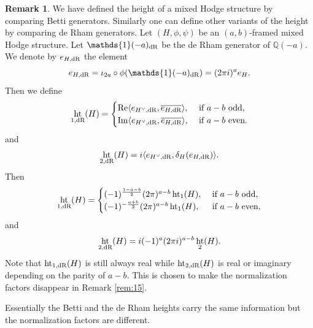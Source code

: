 \documentclass[11pt,a4paper]{amsart}
\newcommand{\dR}{\text{\rm dR}}
\newcommand{\Q}{\mathds{Q}}
\newcommand{\bfone}{{\mathds{1}}}
\DeclareMathOperator{\im}{Im}
\DeclareMathOperator{\re}{Re}
\DeclareMathOperator{\Ht}{ht}
\numberwithin{equation}{section}
\theoremstyle{plain}
\theoremstyle{definition}
\newtheorem{rmk}[prop]{Remark}
\begin{document}
\begin{rmk}\label{rem:14}
  We have defined the height of a mixed Hodge structure by comparing
  Betti generators. Similarly one can define other variants of the height
  by comparing de Rham generators. Let  $(H, \phi,\psi)$ be an $(a,b)$-framed
  mixed Hodge structure. Let $\bfone(-a)_{\dR}$ be the de Rham generator of
  $\Q(-a)$.
  We denote by $e_{H,\dR}$ the element
  \begin{displaymath}
    e_{H,\dR}=\iota_{2a}\circ \phi (\bfone(-a)_{\dR})=
    (2\pi i)^{a}e_{H}.
  \end{displaymath}
  Then we define
  \begin{displaymath}
    \Ht_{1,\dR}(H)=
    \begin{cases}
      \re\langle e_{H^{\vee},\dR},\overline{e_{H,\dR}}\rangle,&\text{ if $a-b$
                                                     odd},\\
      \im\langle e_{H^{\vee},\dR},\overline{e_{H,\dR}}\rangle,&\text{ if
                                                     $a-b$ even}.
    \end{cases}
  \end{displaymath}
  and
  \begin{displaymath}
    \Ht_{2,\dR}(H)=i\langle e_{H^{\vee},\dR},\delta_{H}(e_{H,\dR})\rangle.
  \end{displaymath}
  Then
  \begin{displaymath}
    \Ht_{1,\dR}(H)=
    \begin{cases}
      (-1)^{\frac{1-a-b}{2}}(2\pi )^{a-b}\Ht_{1}(H),&\text{ if $a-b$
                                                      odd},\\
      (-1)^{-\frac{a+b}{2}}(2\pi )^{a-b}\Ht_{1}(H),&\text{ if $a-b$
                                                     even},\\
    \end{cases}
  \end{displaymath}
  and
  \begin{displaymath}
    \Ht_{2,\dR}(H)= i(-1)^{a}(2\pi i)^{a-b}\Ht_{2}(H).
  \end{displaymath}
  Note that $\Ht_{1,\dR}(H)$ is still always real while
  $\Ht_{2,\dR}(H)$ is real or imaginary depending on the parity of
  $a-b$. This is chosen to make the normalization factors disappear in
  Remark \ref{rem:15}.

  Essentially the Betti and the de Rham heights carry the same
  information but the normalization factors are different. 
\end{rmk}
\end{document}

